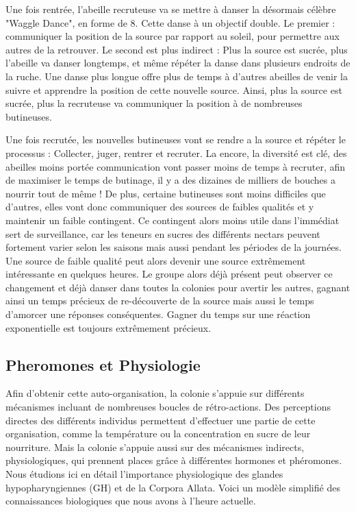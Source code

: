 \documentclass[11pt,a4paper]{report}
\begin{document}
			Une fois rentrée, l'abeille recruteuse va se mettre à danser la désormais célèbre "Waggle Dance", en forme de 8. Cette danse à un objectif double. Le premier : communiquer la position de la source par rapport au soleil, pour permettre aux autres de la retrouver. Le second est plus indirect : Plus la source est sucrée, plus l'abeille va danser longtemps, et même répéter la danse dans plusieurs endroits de la ruche. Une danse plus longue offre plus de temps à d'autres abeilles de venir la suivre et apprendre la position de cette nouvelle source. Ainsi, plus la source est sucrée, plus la recruteuse va communiquer la position à de nombreuses butineuses.
			
			Une fois recrutée, les nouvelles butineuses vont se rendre a la source et répéter le processus : Collecter, juger, rentrer et recruter. La encore, la diversité est clé, des abeilles moins portée communication vont passer moins de temps à recruter, afin de maximiser le temps de butinage, il y a des dizaines de milliers de bouches a nourrir tout de même ! De plus, certaine butineuses sont moins difficiles que d'autres, elles vont donc communiquer des sources de faibles qualités et y maintenir un faible contingent. Ce contingent alors moins utile dans l'immédiat sert de surveillance, car les teneurs en sucres des différents nectars peuvent fortement varier selon les saisons mais aussi pendant les périodes de la journées. Une source de faible qualité peut alors devenir une source extrêmement intéressante en quelques heures. Le groupe alors déjà présent peut observer ce changement et déjà danser dans toutes la colonies pour avertir les autres, gagnant ainsi un temps précieux de re-découverte de la source mais aussi le temps d'amorcer une réponses conséquentes. Gagner du temps sur une réaction exponentielle est toujours extrêmement précieux.
		\subsection{Pheromones et Physiologie}
			Afin d'obtenir cette auto-organisation, la colonie s'appuie sur différents mécanismes incluant de nombreuses boucles de rétro-actions. Des perceptions directes des différents individus permettent d'effectuer une partie de cette organisation, comme la température ou la concentration en sucre de leur nourriture. Mais la colonie s'appuie aussi sur des mécanismes indirects, physiologiques, qui prennent places grâce à différentes hormones et phéromones. Nous étudions ici en détail l'importance physiologique des glandes hypopharyngiennes (GH) et de la Corpora Allata. Voici un modèle simplifié des connaissances biologiques que nous avons à l'heure actuelle.
			
\end{document}

